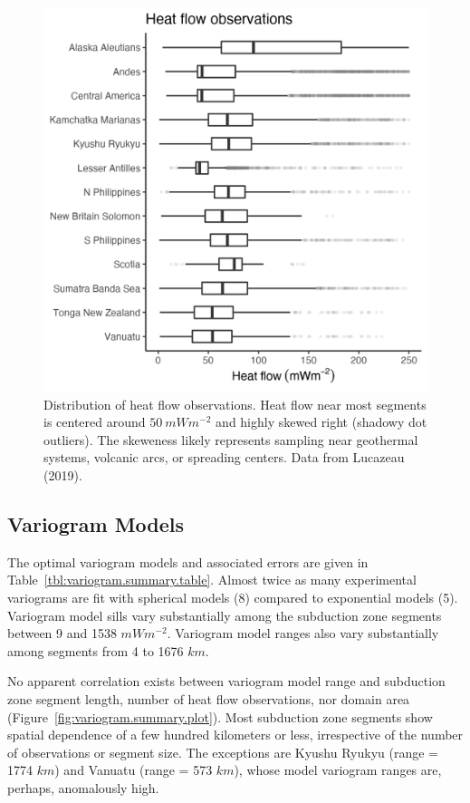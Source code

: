 \documentclass[draft,linenumbers]{agujournal2018}
\begin{document}
\begin{figure}[h]

{\centering \includegraphics[width=0.6\linewidth,]{../figs/summary/hf_summary} 

}

\caption{Distribution of heat flow observations. Heat flow near most segments is centered around $50~mWm^{-2}$ and highly skewed right (shadowy dot outliers). The skeweness likely represents sampling near geothermal systems, volcanic arcs, or spreading centers. Data from Lucazeau (2019).}\label{fig:hf.summary.plot}
\end{figure}

\subsection{Variogram Models}

The optimal variogram models and associated errors are given in
Table~\ref{tbl:variogram.summary.table}. Almost twice as many
experimental variograms are fit with spherical models (8) compared to
exponential models (5). Variogram model sills vary substantially among
the subduction zone segments between 9 and 1538 \(mWm^{-2}\). Variogram
model ranges also vary substantially among segments from 4 to 1676
\(km\).

No apparent correlation exists between variogram model range and
subduction zone segment length, number of heat flow observations, nor
domain area (Figure~\ref{fig:variogram.summary.plot}). Most subduction
zone segments show spatial dependence of a few hundred kilometers or
less, irrespective of the number of observations or segment size. The
exceptions are Kyushu Ryukyu (range = 1774 \(km\)) and Vanuatu (range =
573 \(km\)), whose model variogram ranges are, perhaps, anomalously
high.
\end{document}

